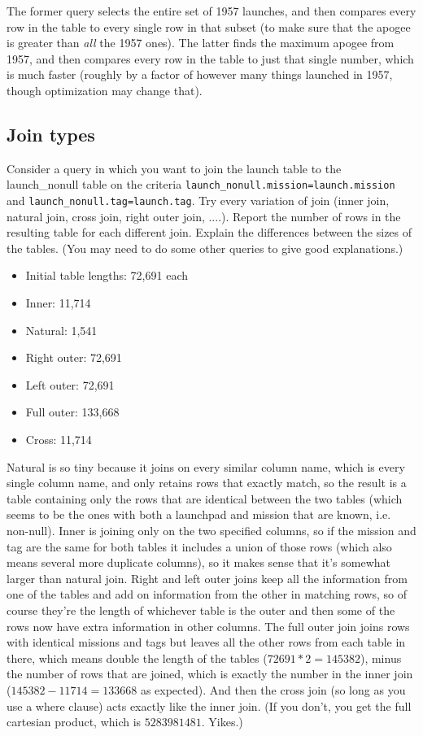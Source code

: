 \documentclass[11pt, oneside]{amsart}   	%
\begin{document}
The former query selects the entire set of 1957 launches, and then compares every row in the table to every single row in that subset (to make sure that the apogee is greater than \textit{all} the 1957 ones). The latter finds the maximum apogee from 1957, and then compares every row in the table to just that single number, which is much faster (roughly by a factor of however many things launched in 1957, though optimization may change that). 

\subsection{Join types}

Consider a query in which you want to join the launch table to the launch\_nonull table on the criteria \texttt{launch\_nonull.mission=launch.mission} and \texttt{launch\_nonull.tag=launch.tag}. Try every variation of join (inner join, natural join, cross join, right outer join, ....). Report the number of rows in the resulting table for each different join. Explain the differences between the sizes of the tables. (You may need to do some other queries to give good explanations.)

\begin{itemize}
    \item Initial table lengths: 72,691 each
    \item Inner: 11,714
    \item Natural: 1,541
    \item Right outer: 72,691
    \item Left outer: 72,691
    \item Full outer: 133,668
    \item Cross: 11,714
\end{itemize}

Natural is so tiny because it joins on every similar column name, which is every single column name, and only retains rows that exactly match, so the result is a table containing only the rows that are identical between the two tables (which seems to be the ones with both a launchpad and mission that are known, i.e. non-null). Inner is joining only on the two specified columns, so if the mission and tag are the same for both tables it includes a union of those rows (which also means several more duplicate columns), so it makes sense that it's somewhat larger than natural join. Right and left outer joins keep all the information from one of the tables and add on information from the other in matching rows, so of course they're the length of whichever table is the outer and then some of the rows now have extra information in other columns. The full outer join joins rows with identical missions and tags but leaves all the other rows from each table in there, which means double the length of the tables ($72691 * 2 = 145382$), minus the number of rows that are joined, which is exactly the number in the inner join ($145382 - 11714 = 133668$ as expected). And then the cross join (so long as you use a where clause) acts exactly like the inner join. (If you don't, you get the full cartesian product, which is $5283981481$. Yikes.)
\end{document}
